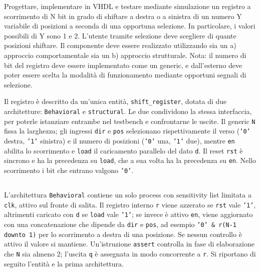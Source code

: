 \label{sec:esercizio4-1}

\begin{traccia}
Progettare, implementare in VHDL e testare mediante simulazione un registro a scorrimento di N bit in grado di shiftare a destra o a sinistra di un numero Y variabile di posizioni a seconda di una opportuna selezione. In particolare, i valori possibili di Y sono 1 e 2. L'utente tramite selezione deve scegliere di quante posizioni shiftare. Il componente deve essere realizzato utilizzando sia un a) approccio comportamentale sia un b) approccio strutturale. Nota: il numero di bit del registro deve essere implementato come un generic, e dall'esterno deve poter essere scelta la modalità di funzionamento mediante opportuni segnali di selezione.
\end{traccia}

\progetto

Il registro è descritto da un'unica entità, \texttt{shift\_register}, dotata di due architetture: \texttt{Behavioral} e \texttt{structural}. Le due condividono la stessa interfaccia, per poterle istanziare entrambe nel testbench e confrontarne le uscite. Il generic \texttt{N} fissa la larghezza; gli ingressi \texttt{dir} e \texttt{pos} selezionano rispettivamente il verso (\texttt{'0'} destra, \texttt{'1'} sinistra) e il numero di posizioni (\texttt{'0'} una, \texttt{'1'} due), mentre \texttt{en} abilita lo scorrimento e \texttt{load} il caricamento parallelo del dato \texttt{d}. Il reset \texttt{rst} è sincrono e ha la precedenza su \texttt{load}, che a sua volta ha la precedenza su \texttt{en}. Nello scorrimento i bit che entrano valgono \texttt{'0'}.

\subsection*{}

\implementazione

L'architettura \texttt{Behavioral} contiene un solo process con sensitivity list limitata a \texttt{clk}, attivo sul fronte di salita. Il registro interno \texttt{r} viene azzerato se \texttt{rst} vale \texttt{'1'}, altrimenti caricato con \texttt{d} se \texttt{load} vale \texttt{'1'}; se invece è attivo \texttt{en}, viene aggiornato con una concatenazione che dipende da \texttt{dir} e \texttt{pos}, ad esempio \texttt{'0' \& r(N-1 downto 1)} per lo scorrimento a destra di una posizione. Se nessun controllo è attivo il valore si mantiene. Un'istruzione \texttt{assert} controlla in fase di elaborazione che \texttt{N} sia almeno 2; l'uscita \texttt{q} è assegnata in modo concorrente a \texttt{r}. Si riportano di seguito l'entità e la prima architettura.

